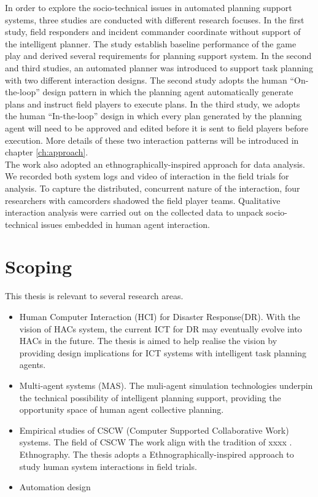 In order to explore the socio-technical issues in automated planning support systems, three studies are conducted with different research focuses. In the first study, field responders and incident commander coordinate without support of the intelligent planner. The study establish baseline performance of the game play and derived several requirements for planning support system. In the second and third studies, an automated planner was introduced to support task planning with two different interaction designs. The second study adopts the human ``On-the-loop'' design pattern in which the planning agent automatically generate plans and instruct field players to execute plans. In the third study, we adopts the human ``In-the-loop'' design in which every plan generated by the planning agent will need to be approved and edited before it is sent to field players before execution. More details of these two interaction patterns will be introduced in chapter \ref{ch:approach}.\\

The work also adopted an ethnographically-inspired approach for data analysis. We recorded both system logs and video of interaction in the field trials for analysis. To capture the distributed, concurrent nature of the interaction, four researchers with camcorders shadowed the field player teams. Qualitative interaction analysis were carried out on the collected data to unpack socio-technical issues embedded in human agent interaction.\\


\section{Scoping}\label{sec:custom}

This thesis is relevant to several research areas. \\

\begin{itemize} 
  \item Human Computer Interaction (HCI) for Disaster Response(DR). With the vision of HACs system, the current ICT for DR may eventually evolve into HACs in the future. The thesis is aimed to help realise the vision by providing design implications for ICT systems with intelligent task planning agents. 
  \item Multi-agent systems (MAS). The muli-agent simulation technologies underpin the technical possibility of intelligent planning support, providing the opportunity space of human agent collective planning. 
  \item Empirical studies of CSCW (Computer Supported Collaborative Work) systems. The field of CSCW  The work align with the tradition of xxxx . Ethnography. The thesis adopts a Ethnographically-inspired approach to study human system interactions in field trials.
  \item Automation design 
\end{itemize}

